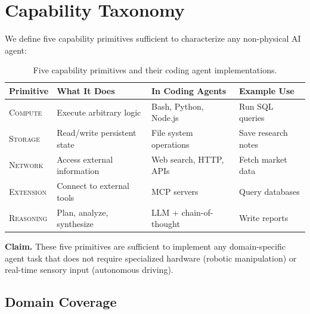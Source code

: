 \section{Capability Taxonomy}

We define five capability primitives sufficient to characterize any non-physical AI agent:

\begin{table}[h]
\caption{Five capability primitives and their coding agent implementations.}
\label{tab:taxonomy}
\centering
\small
\begin{tabular}{@{}llll@{}}
\toprule
\textbf{Primitive} & \textbf{What It Does} & \textbf{In Coding Agents} & \textbf{Example Use} \\
\midrule
\textsc{Compute}   & Execute arbitrary logic   & Bash, Python, Node.js & Run SQL queries \\
\textsc{Storage}   & Read/write persistent state & File system operations & Save research notes \\
\textsc{Network}   & Access external information & Web search, HTTP, APIs & Fetch market data \\
\textsc{Extension} & Connect to external tools  & MCP servers            & Query databases \\
\textsc{Reasoning} & Plan, analyze, synthesize  & LLM + chain-of-thought & Write reports \\
\bottomrule
\end{tabular}
\end{table}

\textbf{Claim.} These five primitives are sufficient to implement any domain-specific agent task that does not require specialized hardware (robotic manipulation) or real-time sensory input (autonomous driving).

\subsection{Domain Coverage}


